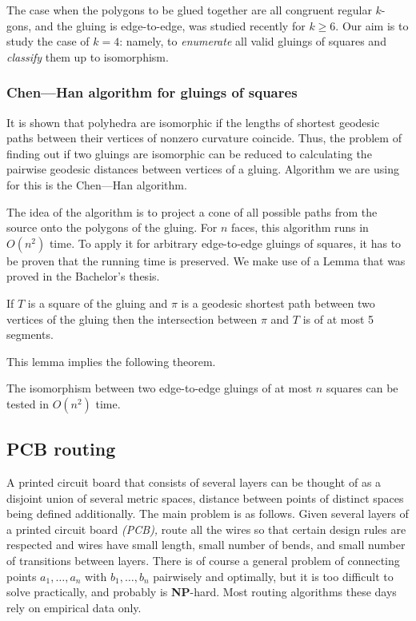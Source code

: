 \documentclass[a4paper,11pt]{article}
\begin{document}
The case when the polygons to be glued together are all congruent regular $k$-gons, and the gluing is edge-to-edge, was studied recently for $k \ge 6$. Our aim is to study the case of $k=4$: namely, to {\it enumerate} all valid gluings of squares and {\it classify} them up to isomorphism.

\subsubsection{Chen—Han algorithm for gluings of squares}

It is shown that polyhedra are isomorphic if the lengths of shortest geodesic paths between their vertices of nonzero curvature coincide. Thus, the problem of finding out if two gluings are isomorphic can be reduced to calculating the pairwise geodesic distances between vertices of a gluing. Algorithm we are using for this is the Chen—Han algorithm.

The idea of the algorithm is to project a cone of all possible paths from the source onto the polygons of the gluing. For $n$ faces, this algorithm runs in $O(n^2)$ time. To apply it for arbitrary edge-to-edge gluings of squares, it has to be proven that the running time is preserved. We make use of a Lemma that was proved in the Bachelor's thesis.

\begin{lemma} \label{lm:shortestSquare}
	If $T$ is a square of the gluing and $\pi$ is a geodesic shortest path between two vertices of the gluing then the intersection between $\pi$ and $T$ is of at most 5 segments.
\end{lemma}

This lemma implies the following theorem.

\begin{theorem} \label{thm:chruntime}
	The isomorphism between two edge-to-edge gluings of at most $n$ squares can be tested in $O(n^2)$ time.
\end{theorem}

\subsection{PCB routing}

A printed circuit board that consists of several layers can be thought of as a disjoint union of several metric spaces, distance between points of distinct spaces being defined additionally. The main problem is as follows. Given several layers of a printed circuit board {\it (PCB),} route all the wires so that certain design rules are respected and wires have small length, small number of bends, and small number of transitions between layers. There is of course a general problem of connecting points $a_1, \ldots, a_n$ with $b_1, \ldots, b_n$ pairwisely and optimally, but it is too difficult to solve practically, and probably is {\bf NP}-hard. Most routing algorithms these days rely on empirical data only.
\end{document}
